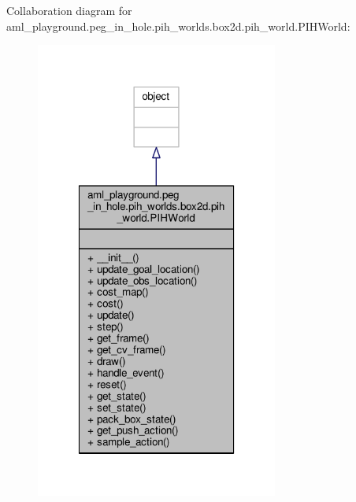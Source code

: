 Collaboration diagram for aml\-\_\-playground.\-peg\-\_\-in\-\_\-hole.\-pih\-\_\-worlds.\-box2d.\-pih\-\_\-world.\-P\-I\-H\-World\-:
\nopagebreak
\begin{figure}[H]
\begin{center}
\leavevmode
\includegraphics[width=226pt]{classaml__playground_1_1peg__in__hole_1_1pih__worlds_1_1box2d_1_1pih__world_1_1_p_i_h_world__coll__graph}
\end{center}
\end{figure}
